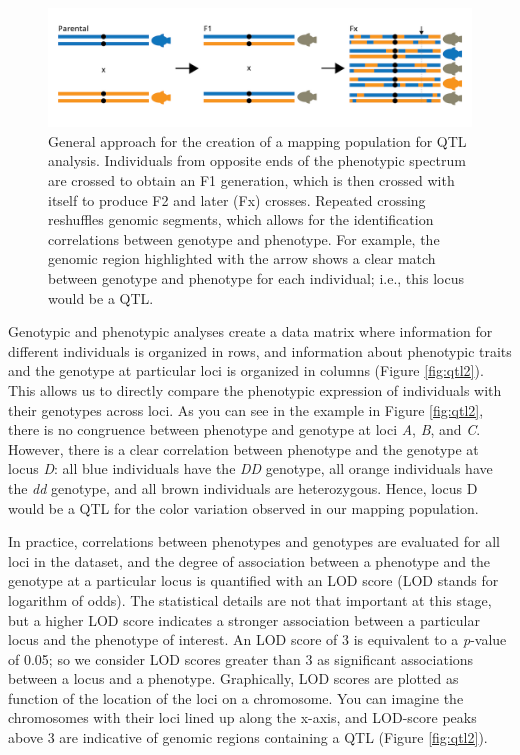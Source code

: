 \documentclass[
]{book}
\begin{document}
\begin{figure}
\includegraphics[width=1\linewidth]{images/qtl} \caption{General approach for the creation of a mapping population for QTL analysis. Individuals from opposite ends of the phenotypic spectrum are crossed to obtain an F1 generation, which is then crossed with itself to produce F2 and later (Fx) crosses. Repeated crossing reshuffles genomic segments, which allows for the identification correlations between genotype and phenotype. For example, the genomic region highlighted with the arrow shows a clear match between genotype and phenotype for each individual; i.e., this locus would be a QTL.}\label{fig:qtl1}
\end{figure}

Genotypic and phenotypic analyses create a data matrix where information for different individuals is organized in rows, and information about phenotypic traits and the genotype at particular loci is organized in columns (Figure \ref{fig:qtl2}). This allows us to directly compare the phenotypic expression of individuals with their genotypes across loci. As you can see in the example in Figure \ref{fig:qtl2}, there is no congruence between phenotype and genotype at loci \emph{A}, \emph{B}, and \emph{C}. However, there is a clear correlation between phenotype and the genotype at locus \emph{D}: all blue individuals have the \emph{DD} genotype, all orange individuals have the \emph{dd} genotype, and all brown individuals are heterozygous. Hence, locus D would be a QTL for the color variation observed in our mapping population.

In practice, correlations between phenotypes and genotypes are evaluated for all loci in the dataset, and the degree of association between a phenotype and the genotype at a particular locus is quantified with an LOD score (LOD stands for logarithm of odds). The statistical details are not that important at this stage, but a higher LOD score indicates a stronger association between a particular locus and the phenotype of interest. An LOD score of 3 is equivalent to a \emph{p}-value of 0.05; so we consider LOD scores greater than 3 as significant associations between a locus and a phenotype. Graphically, LOD scores are plotted as function of the location of the loci on a chromosome. You can imagine the chromosomes with their loci lined up along the x-axis, and LOD-score peaks above 3 are indicative of genomic regions containing a QTL (Figure \ref{fig:qtl2}).
\end{document}
